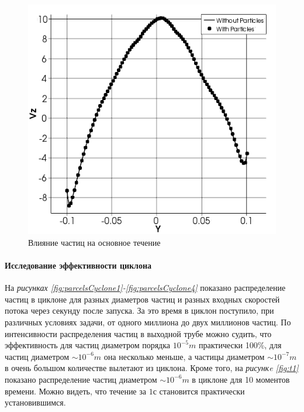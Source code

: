 \begin{figure}[h]
	\centering
	\vspace{-3em}
	\includegraphics[scale=0.4]{parcelsInteraction}
	\caption{Влияние частиц на основное течение}
	\label{fig:parcelsInteraction}
\end{figure}
\vspace{-2em}
\paragraph{Исследование эффективности циклона\\}

На \textit{рисунках \ref{fig:parcelsCyclone1}-\ref{fig:parcelsCyclone4}} показано распределение частиц в циклоне для разных диаметров частиц и разных входных скоростей потока через секунду после запуска. За это время в циклон поступило, при различных условиях задачи, от одного миллиона до двух миллионов частиц. По интенсивности распределения частиц в выходной трубе можно судить, что эффективность для частиц диаметром порядка $10^{-5}m$ практически 100\%, для частиц диаметром $\sim 10^{-6}m$ она несколько меньше, а частицы диаметром $\sim 10^{-7}m$ в очень большом количестве вылетают из циклона. Кроме того, на \textit{рисункe \ref{fig:t1}} показано распределение частиц диаметром $\sim 10^{-6}m$ в циклоне для 10 моментов времени. Можно видеть, что течение за $1$с становится практически установившимся.

